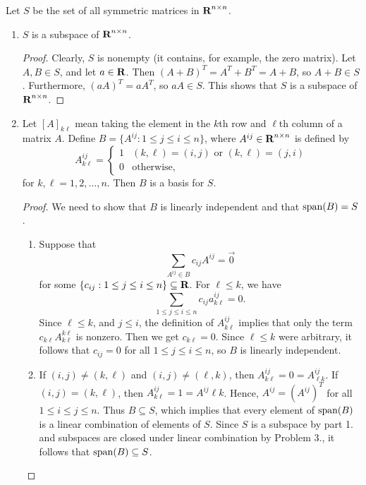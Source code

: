 \documentclass{homework}
\begin{document}
	\question Let $S$ be the set of all symmetric matrices in $\textnormal{\bf R}^{n\times n}$.
	\begin{enumerate}
		\item $S$ is a subspace of $\textnormal{\bf R}^{n\times n}$.
		\begin{proof}
			Clearly, $S$ is nonempty (it contains, for example, the zero matrix). Let $A, B \in S$, and let $a \in \textnormal{\bf R}$. Then
			$(A+B)^T = A^T + B^T = A + B$, so $A+B \in S$. Furthermore, $(aA)^T = aA^T$, so $aA \in S$. This shows that $S$ is a subspace of $\textnormal{\bf R}^{n\times n}$.
		\end{proof}
		
		\item Let $[A]_{k\ell}$ mean taking the element in the $k$th row and $\ell$th column of a matrix $A$. Define $B = \{A^{ij} : 1 \le j \le i \le n\}$, where $A^{ij} \in \textnormal{\bf R}^{n\times n}$ is defined by 
		\begin{equation*}
			A^{ij}_{k\ell} = \begin{cases}
				1 & (k,\ell) = (i, j) \text{ or } (k,\ell) = (j,i) \\
				0 & \text{otherwise,}
			\end{cases}
		\end{equation*}
		for $k,\ell = 1,2,\dots,n$. Then $B$ is a basis for $S$. 
		\begin{proof}
			We need to show that $B$ is linearly independent and that $\mathrm{span}(B) = S$.
			\begin{enumerate}[label=\arabic*.]
				\item Suppose that
				\begin{equation*}
					\sum_{A^{ij} \in B} c_{ij}A^{ij} = \vec{0}
				\end{equation*}
				for some $\{c_{ij} : 1 \le j \le i \le n\}\subseteq\textnormal{\bf R}$. For $\ell \le k$, we have
				\begin{equation*}
					\sum_{1\le j\le i\le n}c_{ij}a^{ij}_{k\ell} = 0.
				\end{equation*}
				Since $\ell \le k$, and $j \le i$, the definition of $A^{ij}_{k\ell}$ implies that only the term $c_{k\ell}A^{k\ell}_{k\ell}$ is nonzero. Then we get $c_{k\ell} = 0$. Since $\ell \le k$ were arbitrary, it follows that $c_{ij} = 0$ for all $1\le j\le i\le n$, so $B$ is linearly independent.
				
				\item If $(i,j) \ne (k,\ell)$ and $(i,j) \ne (\ell, k)$, then $A^{ij}_{k\ell} = 0 = A^{ij}_{\ell k}$. If $(i,j) = (k,\ell)$, then $A^{ij}_{k\ell} = 1 = A^{ij}{\ell k}$. Hence, $A^{ij} = (A^{ij})^T$ for all $1 \le i \le j \le n$. Thus $B \subseteq S$, which implies that every element of $\mathrm{span}(B)$ is a linear combination of elements of $S$. Since $S$ is a subspace by part 1. and subspaces are closed under linear combination by Problem 3., it follows that $\mathrm{span}(B) \subseteq S$.
				

\end{enumerate}
\end{proof}
\end{enumerate}
\end{document}
